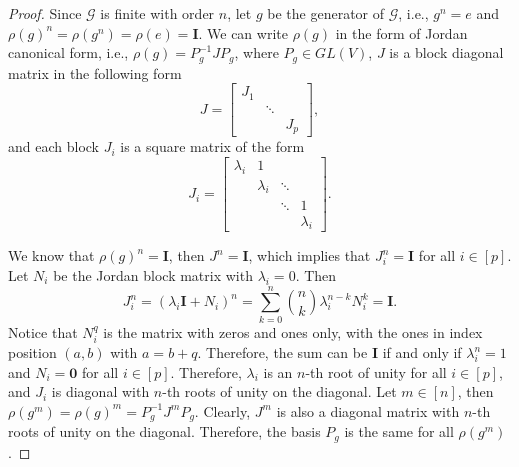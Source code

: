 \documentclass{article}
\theoremstyle{plain}
\theoremstyle{definition}
\theoremstyle{remark}
\theoremstyle{remark}
\begin{document}
    \begin{proof}
    Since $\mathcal{G}$ is finite with order $n$, let $g$ be the generator of $\mathcal{G}$, i.e., $g^n = e$ and $\rho(g)^n = \rho(g^n) = \rho(e) = \mathbf{I}$. We can write $\rho(g)$ in the form of Jordan canonical form, i.e., $\rho(g) = P_g^{-1} J P_g$, where $P_g \in GL(V)$,  $J$ is a block diagonal matrix in the following form
    \begin{equation*}
      J=\left[\begin{array}{ccc}
        J_1 & & \\
        & \ddots & \\
        & & J_p
        \end{array}\right],
    \end{equation*}
    and each block $J_i$ is a square matrix of the form
    \begin{equation*}
    J_i=\left[\begin{array}{cccc}
    \lambda_i & 1 & & \\
    & \lambda_i & \ddots & \\
    & & \ddots & 1 \\
    & & & \lambda_i
    \end{array}\right].
    \end{equation*}
    
    We know that $\rho(g)^n = \mathbf{I}$, then $J^n = \mathbf{I}$, which implies that $J_i^n = \mathbf{I}$ for all $i \in [p]$. Let $N_i$ be the Jordan block matrix with $\lambda_i = 0$. Then 
    \begin{equation*}
      J_i^n = (\lambda_i\mathbf{I}+N_i)^n = \sum_{k=0}^{n} \binom{n}{k} \lambda_i^{n-k} N_i^k = \mathbf{I}.
    \end{equation*}
    Notice that $N_i^q$ is the matrix with zeros and ones only, with the ones in index position $(a,b)$ with $a=b+q$. Therefore, the sum can be $\mathbf{I}$ if and only if $\lambda_i^n = 1$ and $N_i = \mathbf{0}$ for all $i \in [p]$. Therefore, $\lambda_i$ is an $n$-th root of unity for all $i \in [p]$, and $J_i$ is diagonal with $n$-th roots of unity on the diagonal.
    Let $m \in [n]$, then $\rho(g^m) = \rho(g)^m = P_g^{-1} J^m P_g$. Clearly, $J^m$ is also a diagonal matrix with $n$-th roots of unity on the diagonal. Therefore, the basis $P_g$ is the same for all $\rho(g^m)$.
    \end{proof}
\end{document}
